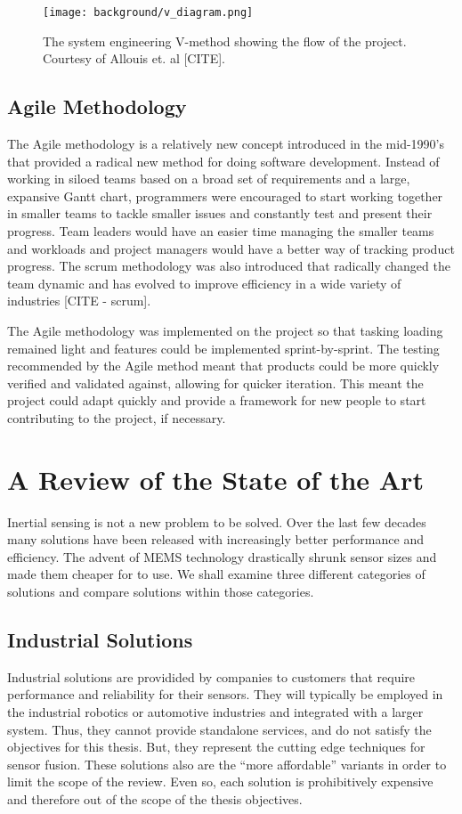 \begin{figure}
    \centering
    \caption{The system engineering V-method showing the flow of the project.
    Courtesy of Allouis et. al [CITE].}
    \texttt{[image: background/v\_diagram.png]}
    \label{fig:v_method}
\end{figure}

\subsection{Agile Methodology}
The Agile methodology is a relatively new concept introduced in the mid-1990's that provided a radical new method for doing software development.
Instead of working in siloed teams based on a broad set of requirements and a large, expansive Gantt chart, programmers were encouraged to start working together in smaller teams to tackle smaller issues and constantly test and present their progress.
Team leaders would have an easier time managing the smaller teams and workloads and project managers would have a better way of tracking product progress.
The scrum methodology was also introduced that radically changed the team dynamic and has evolved to improve efficiency in a wide variety of industries [CITE - scrum].

The Agile methodology was implemented on the project so that tasking loading remained light and features could be implemented sprint-by-sprint.
The testing recommended by the Agile method meant that products could be more quickly verified and validated against, allowing for quicker iteration.
This meant the project could adapt quickly and provide a framework for new people to start contributing to the project, if necessary.

\section{A Review of the State of the Art} \label{sec:literature_review}
Inertial sensing is not a new problem to be solved.
Over the last few decades many solutions have been released with increasingly better performance and efficiency.
The advent of MEMS technology drastically shrunk sensor sizes and made them cheaper for to use.
We shall examine three different categories of solutions and compare solutions within those categories.

\subsection{Industrial Solutions}
Industrial solutions are providided by companies to customers that require performance and reliability for their sensors.
They will typically be employed in the industrial robotics or automotive industries and integrated with a larger system.
Thus, they cannot provide standalone services, and do not satisfy the objectives for this thesis.
But, they represent the cutting edge techniques for sensor fusion.
These solutions also are the ``more affordable'' variants in order to limit the scope of the review.
Even so, each solution is prohibitively expensive and therefore out of the scope of the thesis objectives.

